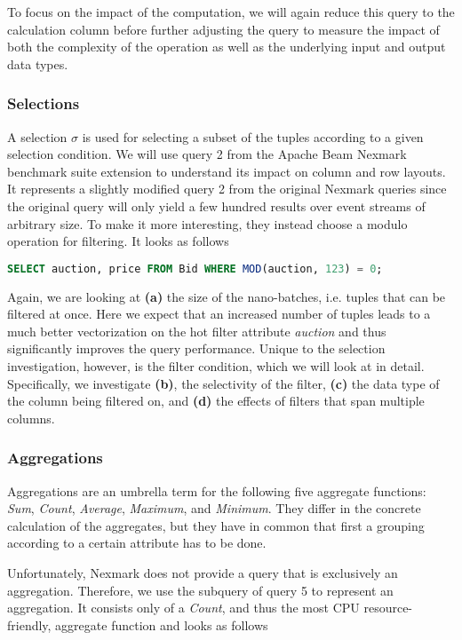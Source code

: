 To focus on the impact of the computation, we will again reduce this query to the calculation column before further adjusting the query to measure the impact of both the complexity of the operation as well as the underlying input and output data types.

\subsubsection{Selections}

A selection $\sigma$ is used for selecting a subset of the tuples according to a given selection condition.
We will use query 2 from the Apache Beam Nexmark benchmark suite extension to understand its impact on column and row layouts. 
It represents a slightly modified query 2 from the original Nexmark queries since the original query will only yield a few hundred results over event streams of arbitrary size.
To make it more interesting, they instead choose a modulo operation for filtering.
It looks as follows

\begin{lstlisting}[language=SQL]
SELECT auction, price FROM Bid WHERE MOD(auction, 123) = 0;
\end{lstlisting}

Again, we are looking at \textbf{(a)} the size of the nano-batches, i.e. tuples that can be filtered at once.
Here we expect that an increased number of tuples leads to a much better vectorization on the hot filter attribute \emph{auction} and thus significantly improves the query performance.
Unique to the selection investigation, however, is the filter condition, which we will look at in detail.
Specifically, we investigate \textbf{(b)}, the selectivity of the filter, \textbf{(c)} the data type of the column being filtered on, and \textbf{(d)} the effects of filters that span multiple columns.

\subsubsection{Aggregations}
Aggregations are an umbrella term for the following five aggregate functions: \emph{Sum}, \emph{Count}, \emph{Average}, \emph{Maximum}, and \emph{Minimum}.
They differ in the concrete calculation of the aggregates, but they have in common that first a grouping according to a certain attribute has to be done.

Unfortunately, Nexmark does not provide a query that is exclusively an aggregation.
Therefore, we use the subquery of query 5 to represent an aggregation.
It consists only of a \emph{Count}, and thus the most CPU resource-friendly, aggregate function and looks as follows

